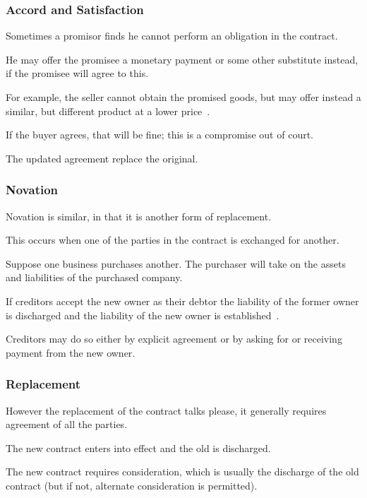 \begin{frame}
\frametitle{Accord and Satisfaction}

Sometimes a promisor finds he cannot perform an obligation in the contract.

He may offer the promisee a monetary payment or some other substitute instead, if the promisee will agree to this.

For example, the seller cannot obtain the promised goods, but may offer instead a similar, but different product at a lower price~\cite{lba}.

If the buyer agrees, that will be fine; this is a compromise out of court.

The updated agreement replace the original.

\end{frame}

\begin{frame}
\frametitle{Novation}

Novation is similar, in that it is another form of replacement.

This occurs when one of the parties in the contract is exchanged for another.

Suppose one business purchases another. The purchaser will take on the assets and liabilities of the purchased company.

If creditors accept the new owner as their debtor the liability of the former owner is discharged and the liability of the new owner is established~\cite{lba}.

Creditors may do so either by explicit agreement or by asking for or receiving payment from the new owner.

\end{frame}



\begin{frame}
\frametitle{Replacement}

However the replacement of the contract talks please, it generally requires agreement of all the parties.

The new contract enters into effect and the old is discharged.

The new contract requires consideration, which is usually the discharge of the old contract (but if not, alternate consideration is permitted).

\end{frame}



